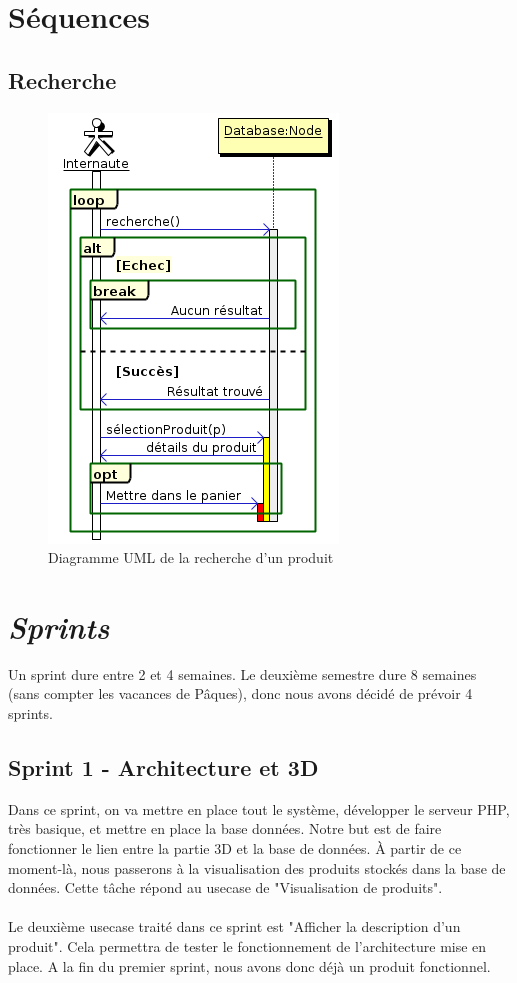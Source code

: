 \documentclass[12pt]{article}
\begin{document}
\newpage
\section{Séquences}

\subsection{Recherche}

\begin{figure}[ht]
    \center
    \includegraphics[scale=0.6]{../Diagrams/SequenceDiagrams/recherche.png}
    \caption*{Diagramme UML de la recherche d'un produit}
\end{figure}


\newpage
\section{\textit{Sprints}}
Un sprint dure entre 2 et 4 semaines. Le deuxième semestre dure 8 semaines (sans compter les vacances de Pâques), donc nous avons décidé de prévoir 4 sprints.

\subsection{Sprint 1 - Architecture et 3D}
Dans ce sprint, on va mettre en place tout le système, développer le serveur PHP, très basique, et mettre en place la base données.
Notre but est de faire fonctionner le lien entre la partie 3D et la base de données.
À partir de ce moment-là, nous passerons à la visualisation des produits stockés dans la base de données. Cette tâche répond au usecase de "Visualisation de produits".\\\\
Le deuxième usecase traité dans ce sprint est "Afficher la description d'un produit". Cela permettra de tester le fonctionnement de l'architecture mise en place.
A la fin du premier sprint, nous avons donc déjà un produit fonctionnel.
\end{document}
